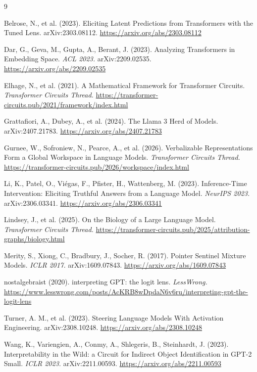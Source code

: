 \documentclass[11pt,a4paper]{article}
\begin{document}
\begin{thebibliography}{9}

Belrose, N., et al. (2023). Eliciting Latent Predictions from Transformers with the Tuned Lens. arXiv:2303.08112. \url{https://arxiv.org/abs/2303.08112}

Dar, G., Geva, M., Gupta, A., Berant, J. (2023). Analyzing Transformers in Embedding Space. \emph{ACL 2023.} arXiv:2209.02535. \url{https://arxiv.org/abs/2209.02535}

Elhage, N., et al. (2021). A Mathematical Framework for Transformer Circuits. \emph{Transformer Circuits Thread.} \url{https://transformer-circuits.pub/2021/framework/index.html}

Grattafiori, A., Dubey, A., et al. (2024). The Llama 3 Herd of Models. arXiv:2407.21783. \url{https://arxiv.org/abs/2407.21783}

Gurnee, W., Sofroniew, N., Pearce, A., et al. (2026). Verbalizable Representations Form a Global Workspace in Language Models. \emph{Transformer Circuits Thread.} \url{https://transformer-circuits.pub/2026/workspace/index.html}

Li, K., Patel, O., Vi\'egas, F., Pfister, H., Wattenberg, M. (2023). Inference-Time Intervention: Eliciting Truthful Answers from a Language Model. \emph{NeurIPS 2023.} arXiv:2306.03341. \url{https://arxiv.org/abs/2306.03341}

Lindsey, J., et al. (2025). On the Biology of a Large Language Model. \emph{Transformer Circuits Thread.} \url{https://transformer-circuits.pub/2025/attribution-graphs/biology.html}

Merity, S., Xiong, C., Bradbury, J., Socher, R. (2017). Pointer Sentinel Mixture Models. \emph{ICLR 2017.} arXiv:1609.07843. \url{https://arxiv.org/abs/1609.07843}

nostalgebraist (2020). interpreting GPT: the logit lens. \emph{LessWrong.} \url{https://www.lesswrong.com/posts/AcKRB8wDpdaN6v6ru/interpreting-gpt-the-logit-lens}

Turner, A. M., et al. (2023). Steering Language Models With Activation Engineering. arXiv:2308.10248. \url{https://arxiv.org/abs/2308.10248}

Wang, K., Variengien, A., Conmy, A., Shlegeris, B., Steinhardt, J. (2023). Interpretability in the Wild: a Circuit for Indirect Object Identification in GPT-2 Small. \emph{ICLR 2023.} arXiv:2211.00593. \url{https://arxiv.org/abs/2211.00593}

\end{thebibliography}
\end{document}
